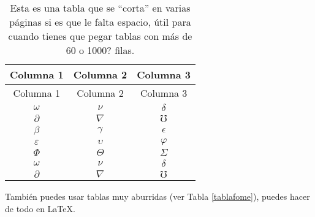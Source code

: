 \documentclass[letterpaper,11pt]{article}	%
\newcommand{\quotes}[1]{``#1''}		%
\newcommand{\newparnl}[1]{#1 \par}		%
\begin{document}
		\begin{longtable}{ccc}
			\caption{Esta es una tabla que se \quotes{corta} en varias páginas si es que le falta espacio, útil para cuando tienes que pegar tablas con más de 60 o 1000? filas.}\label{foo}\\
			\hline
			Columna 1 & Columna 2 & Columna 3\\\hline
			\endfirsthead
			\hline
			Columna 1 & Columna 2 & Columna 3\\
			\hline
			\endhead
			\hline
			\endfoot
			\hline
			\endlastfoot
			$\omega$ & $\nu$ & $\delta$\\     
			$\partial$ & $\nabla$ & $\mho$\\
			$\beta$ & $\gamma$ & $\epsilon$\\   
			$\varepsilon$ & $\upsilon$ & $\varphi$\\
			$\Phi$ & $\Theta$ & $\varSigma$\\
			$\omega$ & $\nu$ & $\delta$\\     
			$\partial$ & $\nabla$ & $\mho$\\ 
		\end{longtable}
		
		\newparnl{También puedes usar tablas muy aburridas (ver Tabla \ref{tablafome}), puedes hacer de todo en \LaTeX.}
		
\end{document}
